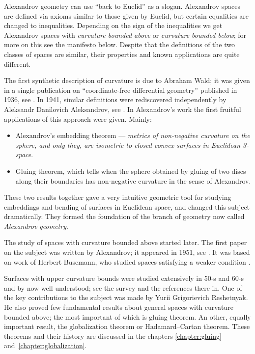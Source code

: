 Alexandrov geometry can use ``back to Euclid'' as a slogan.
Alexandrov spaces are defined via axioms similar to those given by Euclid,
but certain  equalities are changed to inequalities. 
Depending on the sign of the inequalities we get Alexandrov spaces with \emph{curvature bounded above} or \emph{curvature bounded below};
for more on this see the manifesto below.
Despite that the definitions of the two classes of spaces are similar, their properties and known applications are quite different.

The first synthetic description of curvature is due to Abraham Wald; 
it was given in a single publication  on ``coordinate-free differential geometry''
 published in 1936, see \cite{wald}.
In 1941, similar definitions were rediscovered independently by Aleksandr Danilovich Aleksandrov,
see \cite{alexandrov:def}.
In Alexandrov's work the first fruitful applications of this approach were given.
Mainly:
\begin{itemize}
\item Alexandrov's embedding theorem  --- 
\textit{metrics of non-negative curvature on the sphere, and only they, are isometric to closed convex surfaces in Euclidean 3-space}. 
\item Gluing theorem, which tells  when the sphere obtained by gluing of two discs along their boundaries has non-negative curvature in the sense of Alexandrov.
\end{itemize}
These two results together gave  a very intuitive geometric tool for studying  embeddings and bending of surfaces in  Euclidean space, and changed this subject dramatically.
They formed the foundation of the branch of geometry now called \emph{Alexandrov geometry}.

The study of  spaces with curvature bounded above started later.
The first paper on the subject was written by Alexandrov; it appeared in 1951, see \cite{alexandrov:strong-angle}.
It was based on work of Herbert Busemann, who studied spaces satisfying a weaker condition \cite{busemann-CBA}.

Surfaces with upper curvature bounds were studied extensively in 50-s and 60-s and by now well understood; see the survey \cite{reshetnyak:survey} and the references there in.
One of the key contributions to the subject was made by Yurii Grigorievich Reshetnyak.
He also proved few fundamental results about general spaces with curvature bounded above;
the most important of which is gluing theorem.
An other, equally important result, the globalization theorem or Hadamard--Cartan theorem.
These theorems and their history are discussed in the chapters \ref{chapter:gluing} and~\ref{chapter:globalization}.


